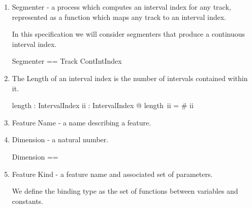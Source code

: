 \documentclass[11pt]{article}
\begin{document}
\begin{enumerate}
\item \textsf{Segmenter} - a process which computes an interval index  for any track, represented as a function which maps any track to an interval index.

\begin{flushright}
  \begin{tikzpicture}
    
    
  \end{tikzpicture}
\end{flushright}


In this specification we will consider segmenters that produce a continuous interval index. 

\begin{zed}
	Segmenter == Track \fun ContIntIndex  \\
\end{zed}

\item The \textsf{Length} of an interval index is the number of intervals contained within it. 

\begin{axdef}
	length : IntervalIndex \fun \nat 
\where
	\forall ii : IntervalIndex @ length~ii = \# ii
\end{axdef}


\item \textsf{Feature Name} - a name describing a feature.

\begin{zed}
	[FeatureName]
\end{zed}

\item \textsf{Dimension} - a natural number.

\begin{zed}
	Dimension ==	 \nat
\end{zed}

\item \textsf{Feature Kind} - a feature name and associated set of parameters. 

\begin{zed}
\end{zed}

We define the binding type as the set of functions between variables and constants. 


\end{enumerate}
\end{document}
